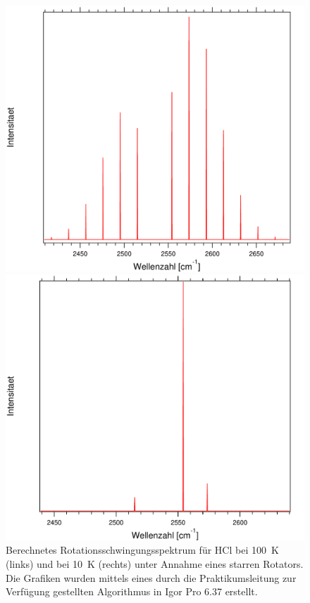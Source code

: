 \begin{figure}[H]
	
	\begin{minipage}{0.5\textwidth}
	\includegraphics[width=\textwidth]{Bilder/100HCl.pdf}
	
	\end{minipage}
\begin{minipage}{0.5\textwidth}
	\includegraphics[width=\textwidth]{Bilder/10HCl.pdf}
	
	\end{minipage}	
	\caption{Berechnetes Rotationsschwingungsspektrum für HCl bei 100~K (links) und bei 10~K (rechts) unter Annahme eines starren Rotators. Die Grafiken wurden mittels eines durch die Praktikumsleitung zur Verfügung gestellten Algorithmus in Igor Pro 6.37 erstellt.}
	\label{Rot:100HCl}
		
	
\end{figure}

